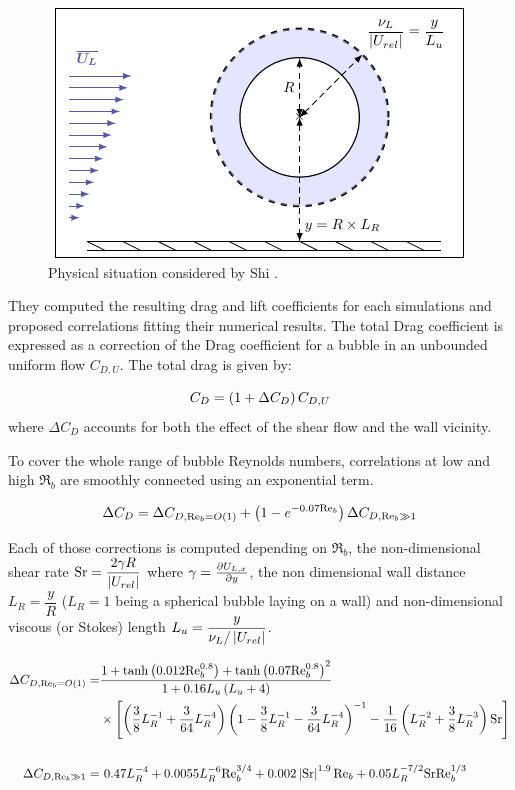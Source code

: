 \begin{figure}[h!]
\centering
\includegraphics[width=0.55\linewidth]{img/forces/shi_scheme.pdf}
\caption{Physical situation considered by Shi \etal \cite{shi_drag_2021}.}
\label{fig:shi_scheme}
\end{figure}


They computed the resulting drag and lift coefficients for each simulations and proposed correlations fitting their numerical results. The total Drag coefficient is expressed as a correction of the Drag coefficient for a bubble in an unbounded uniform flow  $C_{D,U}$. The total drag is given by:

\begin{equation}
C_{D}=\left( 1+\Delta C_{D} \right)C_{D,U}
\end{equation}
where $\Delta C_{D}$ accounts for both the effect of the shear flow and the wall vicinity. 

\npar
To cover the whole range of bubble Reynolds numbers, correlations at low and high $\Re_{b}$ are smoothly connected using an exponential term.

\begin{equation}
\Delta C_{D}=\Delta C_{D,\mathrm{Re}_{b}=O\left( 1 \right)}+\left( 1-e^{-0.07\mathrm{Re}_{b}} \right)\Delta C_{D,{\mathrm{Re}_{b}\gg 1}}
\label{eq:drag_corr_shi}
\end{equation}


Each of those corrections is computed depending on $\Re_{b}$,  the non-dimensional shear rate $\mathrm{Sr} = \dfrac{2 \gamma R}{\left| U_{rel} \right| }$ where $\gamma = \frac{\partial U_{L,x}}{\partial y}$, the non dimensional wall distance $L_{R} = \dfrac{y}{R}$   ($L_{R}=1$ being a spherical bubble laying on a wall) and non-dimensional viscous (or Stokes) length $L_{u}=\dfrac{y}{\nu_{L}/\left| U_{rel} \right|}$. 


\begin{align}
\nonumber \Delta C_{D,\Re_{b}=O\parth{1}} = & \frac{1+\mathrm{tanh}\parth{0.012\Re_{b}^{0.8}} + \mathrm{tanh}\parth{0.07\Re_{b}^{0.8}}^{2}}{1+0.16L_{u}\parth{L_{u}+4}}\\
& \times \left[ \left(\frac{3}{8}L_{R}^{-1} + \frac{3}{64}L_{R}^{-4}\right) \left(1- \frac{3}{8}L_{R}^{-1}-\frac{3}{64}L_{R}^{-4}\right)^{-1} - \frac{1}{16}\left(L_{R}^{-2}+\frac{3}{8}L_{R}^{-3}\right)\text{Sr} \right] \\
%
\nonumber\\
\Delta C_{D,{\Re_{b}\gg 1}} =& ~0.47L_{R}^{-4}+0.0055L_{R}^{-6}\Re_{b}^{3/4} 
+0.002 \bars{\mathrm{Sr}}^{1.9} \Re_{b} + 0.05 L_{R}^{-7/2} \mathrm{Sr} \Re_{b}^{1/3}
\end{align}


